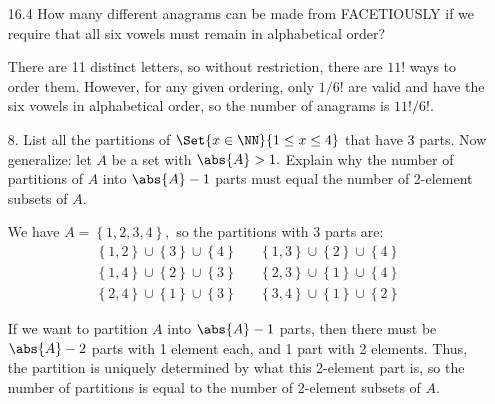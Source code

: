 \documentclass{article}
\begin{document}
\begin{itemize}
\begin{enumerate}[(a)]
		\end{enumerate}

	\item[16.4] How many different anagrams can be made from FACETIOUSLY if we require that all six vowels must remain in alphabetical order?
		\begin{soln}
			There are 11 distinct letters, so without restriction, there are $11!$ ways to order them. However, for any given ordering, only $1/6!$ are valid and have the six vowels in alphabetical order, so the number of anagrams is $\boxed{11!/6!.}$
		\end{soln}

		\newpage
	\item[8.] List all the partitions of $\Set{x\in\NN}{1\le x\le 4}$ that have 3 parts. Now generalize: let $A$ be a set with $\abs{A}>1.$ Explain why the number of partitions of $A$ into $\abs{A}-1$ parts must equal the number of 2-element subsets of $A.$
		\begin{soln}
			We have $A=\left\{ 1, 2, 3, 4 \right\},$ so the partitions with 3 parts are:
			\begin{align*}
				\left\{ 1, 2 \right\}\cup \left\{ 3 \right\}\cup \left\{ 4 \right\} & & \left\{ 1, 3 \right\}\cup \left\{ 2 \right\}\cup \left\{ 4 \right\} \\
				\left\{ 1, 4 \right\}\cup \left\{ 2 \right\}\cup\left\{ 3 \right\} & &\left\{ 2, 3 \right\}\cup \left\{ 1 \right\}\cup\left\{ 4 \right\} \\
				\left\{ 2, 4 \right\}\cup \left\{ 1 \right\}\cup \left\{ 3 \right\} & &\left\{ 3, 4 \right\}\cup \left\{ 1 \right\}\cup\left\{ 2 \right\}
			\end{align*}

			If we want to partition $A$ into $\abs{A}-1$ parts, then there must be $\abs{A}-2$ parts with 1 element each, and 1 part with 2 elements. Thus, the partition is uniquely determined by what this 2-element part is, so the number of partitions is equal to the number of 2-element subsets of $A.$
		\end{soln}

\end{itemize}
\end{document}
